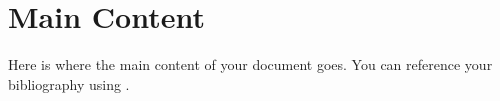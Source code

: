 \chapter{Main Content}
Here is where the main content of your document goes. You can reference your bibliography using \cite{sample2023}.\cite{samplebook2023}\cite{sampleconference2023}